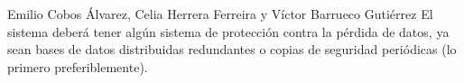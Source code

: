 {Emilio Cobos Álvarez, Celia Herrera Ferreira y Víctor Barrueco Gutiérrez}
{}
{}
{}
{El sistema deberá tener algún sistema de protección contra la pérdida de datos, ya sean bases de datos distribuidas redundantes o copias de seguridad periódicas (lo primero preferiblemente).}

